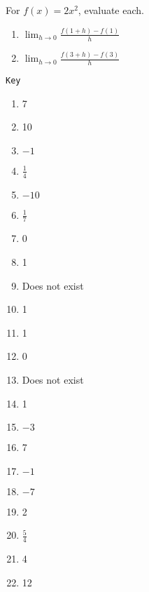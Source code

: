 \documentclass{article}
\newcounter{pset}
\begin{document}
For $f(x) = 2x^2$, evaluate each.
\begin{multicols}{2}
\begin{enumerate}   \setcounter{enumi}{\value{pset}}
    \item $\lim_{h \to 0} \frac{f(1+h)-f(1)}{h}$
    \item $\lim_{h \to 0} \frac{f(3+h)-f(3)}{h}$
\end{enumerate}
\end{multicols}

\newpage

\texttt{Key}

\begin{enumerate}
    \item 7
    \item 10
    \item $-1$
    \item $\frac{1}{4}$
    \item $-10$
    \item $\frac{1}{7}$
    \item 0
    \item 1
    \item Does not exist
    \item 1
    \item 1
    \item 0
    \item Does not exist
    \item 1
    \item $-3$
    \item 7
    \item $-1$
    \item $-7$
    \item 2
    \item $\frac{5}{4}$
    \item 4
    \item 12
\end{enumerate}
\end{document}
